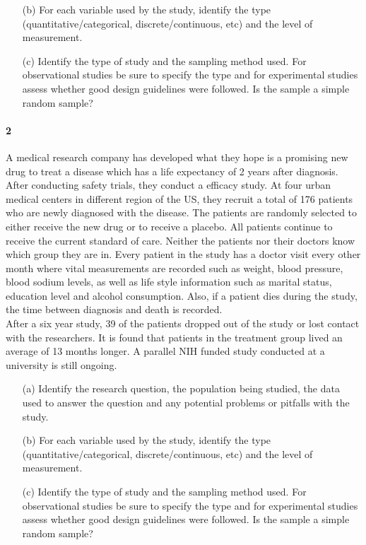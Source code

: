 \documentclass{article}
\begin{document}
\begin{flushleft}
\begin{itemize}
\item[(b)] For each variable used by the study, identify the type (quantitative/categorical, discrete/continuous, etc) and the level of measurement.\\
\medskip
{}
\vspace{1.5in}
\item[(c)] Identify the type of study and the sampling method used. For observational studies be sure to specify the type and for experimental studies assess whether good design guidelines were followed. Is the sample a simple random sample? 
\end{itemize}



\newpage
\paragraph{2} A medical research company has developed what they hope is a promising new drug to treat a disease which has a life expectancy of 2 years after diagnosis. After conducting safety trials, they conduct a efficacy study. At four urban medical centers in different region of the US, they recruit a total of 176 patients who are newly diagnosed with the disease. The patients are randomly selected to either receive the new drug or to receive a placebo. All patients continue to receive the current standard of care. Neither the patients nor their doctors know which group they are in. Every patient in the study has a doctor visit every other month where vital measurements are recorded such as weight, blood pressure, blood sodium levels, as well as life style information such as marital status, education level and alcohol consumption. Also, if a patient dies during the study, the time between diagnosis and death is recorded.\\
\medskip
After a six year study, 39 of the patients dropped out of the study or lost contact with the researchers. It is found that patients in the treatment group lived an average of 13 months longer. A parallel NIH funded study conducted at a university is still ongoing.

\begin{itemize}
\item [(a)] Identify the research question, the population being studied, the data used to answer the question and any potential problems or pitfalls with the study.
\vspace{1.5in}
\item[(b)] For each variable used by the study, identify the type (quantitative/categorical, discrete/continuous, etc) and the level of measurement.
\vspace{1.5in}
\item[(c)] Identify the type of study and the sampling method used. For observational studies be sure to specify the type and for experimental studies assess whether good design guidelines were followed. Is the sample a simple random sample? 
\end{itemize}



\end{flushleft}
\end{document}
